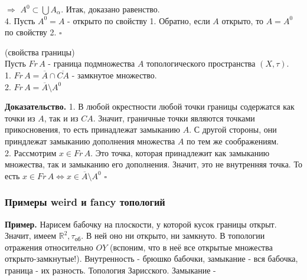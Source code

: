 $\Rightarrow$ $A^0\subset \bigcup A_\alpha$. Итак, доказано равенство.\\
4. Пусть $A^0=A$ - открыто по свойству 1. Обратно, если  $A$ открыто, то
 $A=A^0$ по свойству 2. 
$\square$ 
\begin{theor}
    (свойства границы)\\
Пусть $Fr\, A$ - граница подмножества $A$ топологического пространства 
$(X,\tau)$.\\
1. $Fr\,A=\overline{A}\cap\overline{CA}$ - замкнутое множество.\\
2. $Fr\,A=\overline{A}\setminus A^0$
\end{theor}
\textbf{Доказательство.} 
1. В любой окрестности любой точки границы содержатся как точки из $A$, так
и из  $CA$. Значит, граничные точки являются точками прикосновения, то 
есть принадлежат замыканию  $A$. С другой стороны, они приндлежат
замыканию дополнения множества  $A$ по тем же соображениям.\\
2. Рассмотрим $x\in Fr\,A$. Это точка, которая принадлежит как замыканию
множества, так и замыканию его дополнения. Значит, это не внутренняя точка. 
То есть $x\in Fr\,A\iff x\in \overline{A}\setminus A^0$
$\square$ \\
\subsubsection{Примеры weird и fancy топологий}
\textbf{Пример.} Нарисем бабочку на плоскости, у которой кусок границы открыт.
Значит, имеем $\mathbb{R}^2,\tau_{\text{об}}$. В ней оно ни открыто, ни
замкнуто. В топологии отражения относительно $OY$ (вспоним, что в неё все
открытые множества открыто-замкнутые!). Внутренность - брюшко бабочки,
замыкание - вся бабочка, граница - их разность. 
Топология Зарисского. Замыкание -  



